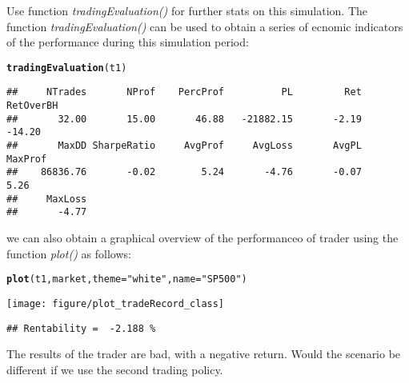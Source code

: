\documentclass{article}\usepackage[]{graphicx}\usepackage[]{color}
\makeatletter
\def\maxwidth{ %
  \ifdim\Gin@nat@width>\linewidth
    \linewidth
  \else
    \Gin@nat@width
  \fi
}
\newcommand{\hlstr}[1]{\textcolor[rgb]{0.192,0.494,0.8}{#1}}%
\newcommand{\hlstd}[1]{\textcolor[rgb]{0.345,0.345,0.345}{#1}}%
\newcommand{\hlkwc}[1]{\textcolor[rgb]{0.333,0.667,0.333}{#1}}%
\newcommand{\hlkwd}[1]{\textcolor[rgb]{0.737,0.353,0.396}{\textbf{#1}}}%
\newenvironment{kframe}{%
 \def\at@end@of@kframe{}%
 \ifinner\ifhmode%
  \def\at@end@of@kframe{\end{minipage}}%
  \begin{minipage}{\columnwidth}%
 \fi\fi%
 \def\FrameCommand##1{\hskip\@totalleftmargin \hskip-\fboxsep
 \colorbox{shadecolor}{##1}\hskip-\fboxsep
     \hskip-\linewidth \hskip-\@totalleftmargin \hskip\columnwidth}%
 \MakeFramed {\advance\hsize-\width
   \@totalleftmargin\z@ \linewidth\hsize
   \@setminipage}}%
 {\par\unskip\endMakeFramed%
 \at@end@of@kframe}
\newenvironment{knitrout}{}{} %
\makeatother
\begin{document}
Use function \textit{tradingEvaluation()} for further  stats on this simulation. The function \textit{tradingEvaluation()} can be used to obtain a series of ecnomic indicators of the performance during this simulation period:
\begin{knitrout}
\color{fgcolor}\begin{kframe}
\begin{alltt}
\hlkwd{tradingEvaluation}\hlstd{(t1)}
\end{alltt}
\begin{verbatim}
##     NTrades       NProf    PercProf          PL         Ret   RetOverBH 
##       32.00       15.00       46.88   -21882.15       -2.19      -14.20 
##       MaxDD SharpeRatio     AvgProf     AvgLoss       AvgPL     MaxProf 
##    86836.76       -0.02        5.24       -4.76       -0.07        5.26 
##     MaxLoss 
##       -4.77
\end{verbatim}
\end{kframe}
\end{knitrout}
we can also obtain a graphical overview of the performanceo of trader using the function \textit{plot()} as follows:
\begin{knitrout}
\color{fgcolor}\begin{kframe}
\begin{alltt}
\hlkwd{plot}\hlstd{(t1, market,} \hlkwc{theme} \hlstd{=} \hlstr{"white"}\hlstd{,} \hlkwc{name} \hlstd{=} \hlstr{"SP500"}\hlstd{)}
\end{alltt}
\end{kframe}
\texttt{[image: figure/plot\_tradeRecord\_class]} 
\begin{kframe}\begin{verbatim}
## Rentability =  -2.188 %
\end{verbatim}
\end{kframe}
\end{knitrout}
The results of the trader are bad, with a negative return. Would the scenario be different if we use the second trading policy.
\end{document}
